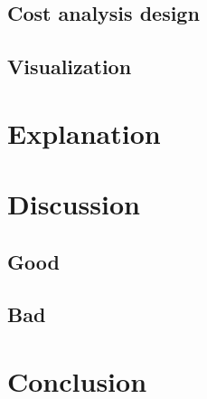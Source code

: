 \documentclass [12pt]{article}
\begin{document}
\subsection{Cost analysis design}
\subsection{Visualization}
\section{Explanation}
\section{Discussion}
\subsection{Good}
\subsection{Bad}
\section{Conclusion}


\end{document}
